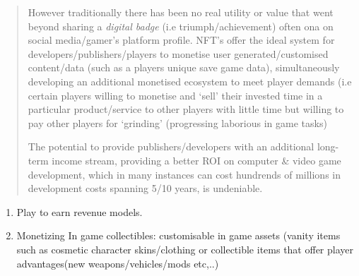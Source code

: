\begin{quote}
However traditionally there has been no real utility or value that went
beyond sharing a \emph{digital badge} (i.e triumph/achievement) often
ona on social media/gamer's platform profile. NFT's offer the ideal
system for developers/publishers/players to monetise user
generated/customised content/data (such as a players unique save game
data), simultaneously developing an additional monetised ecosystem to
meet player demands (i.e certain players willing to monetise and `sell'
their invested time in a particular product/service to other players
with little time but willing to pay other players for `grinding'
(progressing laborious in game tasks)

The potential to provide publishers/developers with an additional
long-term income stream, providing a better ROI on computer \& video
game development, which in many instances can cost hundrends of millions
in development costs spanning 5/10 years, is undeniable.
\end{quote}

\begin{enumerate}
\def\labelenumi{\alph{enumi}.}
\setcounter{enumi}{2}
\item
  Play to earn revenue models.
\item
  Monetizing In game collectibles: customisable in game assets (vanity
  items such as cosmetic character skins/clothing or collectible items
  that offer player advantages(new weapons/vehicles/mods etc,..)
\end{enumerate}
